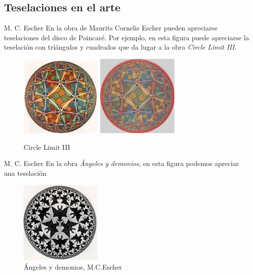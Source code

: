\documentclass[compress]{beamer}
\begin{document}
\subsection{Teselaciones en el arte}
\begin{frame}{M. C. Escher}
  En la obra de Maurits Cornelis Escher pueden apreciarse teselaciones
  del disco de Poincaré. Por ejemplo, en esta figura puede apreciarse
  la teselación con triángulos y cuadrados que da lugar a la obra
  \textit{Circle Limit III}.

  \begin{figure}[ht!]
    \centering
    \includegraphics[width=40mm]{./limit3.jpg}
    \includegraphics[width=40mm]{./limit3overlay.png}
    \caption{Circle Limit III\label{limit3}}
  \end{figure}
\end{frame}


\begin{frame}{M. C. Escher}
  En la obra \textit{Ángeles y demonios}, en esta figura podemos
  apreciar una teselación

  \begin{figure}[ht!]
    \centering
    \includegraphics[width=40mm]{./limit2.jpg}
    \caption{Ángeles y demonios, M.C.Escher  \label{angels}}
  \end{figure}
\end{frame}
\end{document}
